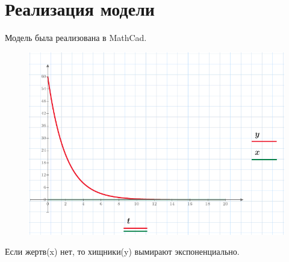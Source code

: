 \documentclass[a4paper, 14pt]{extarticle}
\begin{document}
	\section{Реализация модели}
		Модель была реализована в MathCad.
		\begin{figure}[H]
			\centering
			\includegraphics[width = \linewidth]{1.pdf}
			\caption[.] {}
		\end{figure}
		Если жертв(x) нет, то хищники(y) вымирают экспоненциально.
	
\end{document}
